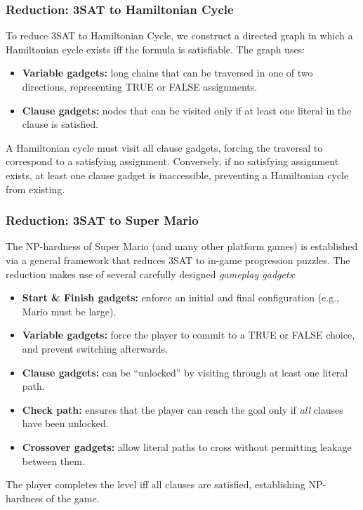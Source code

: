 \documentclass[9pt]{extarticle}
\begin{document}
\subsubsection{Reduction: 3SAT to Hamiltonian Cycle}
To reduce 3SAT to Hamiltonian Cycle, we construct a directed graph in which a
Hamiltonian cycle exists iff the formula is satisfiable. The graph uses:
\begin{itemize}
    \item \textbf{Variable gadgets:} long chains that can be traversed in one
          of two directions, representing TRUE or FALSE assignments.
    \item \textbf{Clause gadgets:} nodes that can be visited only if at least
          one literal in the clause is satisfied.
\end{itemize}
A Hamiltonian cycle must visit all clause gadgets, forcing the traversal to
correspond to a satisfying assignment.  
Conversely, if no satisfying assignment exists, at least one clause gadget is
inaccessible, preventing a Hamiltonian cycle from existing.

\subsubsection{Reduction: 3SAT to Super Mario}
The NP-hardness of Super Mario (and many other platform games) is established
via a general framework that reduces 3SAT to in-game progression puzzles.
The reduction makes use of several carefully designed \emph{gameplay gadgets}:
\begin{itemize}
    \item \textbf{Start \& Finish gadgets:}
          enforce an initial and final configuration (e.g., Mario must be large).
    \item \textbf{Variable gadgets:}
          force the player to commit to a TRUE or FALSE choice, and prevent
          switching afterwards.
    \item \textbf{Clause gadgets:}
          can be ``unlocked'' by visiting through at least one literal path.
    \item \textbf{Check path:}
          ensures that the player can reach the goal only if \emph{all} clauses
          have been unlocked.
    \item \textbf{Crossover gadgets:}
          allow literal paths to cross without permitting leakage between them.
\end{itemize}
The player completes the level iff all clauses are satisfied, establishing
NP-hardness of the game.
\end{document}
